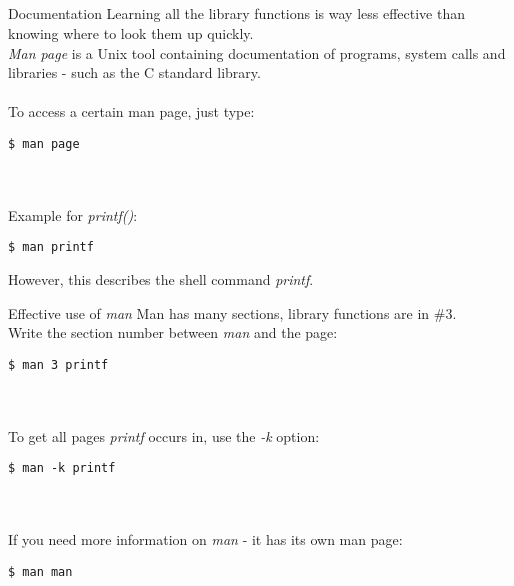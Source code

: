 \subsection{}
\begin{frame}[fragile]{Documentation}
	Learning all the library functions is way less effective than knowing where to look them up quickly. \\
	\textit{Man page} is a Unix tool containing documentation of programs, system calls and libraries - such as the C standard library. \\ \ \\
	To access a certain man page, just type:
	\begin{lstlisting}[numbers=none, basicstyle=\itshape\small]
$ man page
\end{lstlisting} \ \\ \ \\
Example for \textit{printf()}:
	\begin{lstlisting}[numbers=none]
$ man printf
\end{lstlisting}
However, this describes the shell command \textit{printf}.
\end{frame}
\begin{frame}[fragile]{Effective use of \textit{man}}
	Man has many sections, library functions are in \#3. \\
	Write the section number between \textit{man} and the page:
	\begin{lstlisting}[numbers=none]
$ man 3 printf
\end{lstlisting} \ \\ \ \\
	To get all pages \textit{printf} occurs in, use the \textit{-k} option:
	\begin{lstlisting}[numbers=none]
$ man -k printf
\end{lstlisting} \ \\ \ \\
	If you need more information on \textit{man} - it has its own man page:
	\begin{lstlisting}[numbers=none]
$ man man
\end{lstlisting}
\end{frame}



